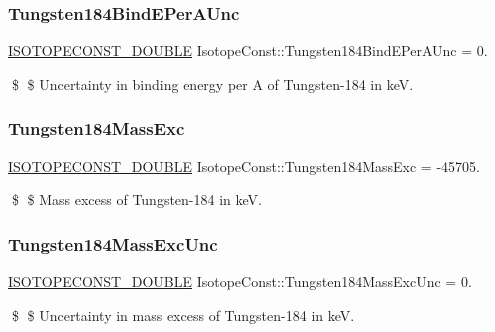 \subsubsection{\texorpdfstring{Tungsten184\+Bind\+E\+Per\+A\+Unc}{Tungsten184BindEPerAUnc}}
{\footnotesize\ttfamily \mbox{\hyperlink{group___isotope_const-_macros_ga8f45a7272ce02c0b4c65c44636ed719a}{I\+S\+O\+T\+O\+P\+E\+C\+O\+N\+S\+T\+\_\+\+D\+O\+U\+B\+LE}} Isotope\+Const\+::\+Tungsten184\+Bind\+E\+Per\+A\+Unc = 0.}

\$ \$ Uncertainty in binding energy per A of Tungsten-\/184 in keV. \mbox{\label{group___isotope_const-_tungsten-_w184_ga936ce3bcb4d1b86f91b8122a8a11d995}} 
\subsubsection{\texorpdfstring{Tungsten184\+Mass\+Exc}{Tungsten184MassExc}}
{\footnotesize\ttfamily \mbox{\hyperlink{group___isotope_const-_macros_ga8f45a7272ce02c0b4c65c44636ed719a}{I\+S\+O\+T\+O\+P\+E\+C\+O\+N\+S\+T\+\_\+\+D\+O\+U\+B\+LE}} Isotope\+Const\+::\+Tungsten184\+Mass\+Exc = -\/45705.}

\$ \$ Mass excess of Tungsten-\/184 in keV. \mbox{\label{group___isotope_const-_tungsten-_w184_ga24de14b6b66435d3f780bef85411e705}} 
\subsubsection{\texorpdfstring{Tungsten184\+Mass\+Exc\+Unc}{Tungsten184MassExcUnc}}
{\footnotesize\ttfamily \mbox{\hyperlink{group___isotope_const-_macros_ga8f45a7272ce02c0b4c65c44636ed719a}{I\+S\+O\+T\+O\+P\+E\+C\+O\+N\+S\+T\+\_\+\+D\+O\+U\+B\+LE}} Isotope\+Const\+::\+Tungsten184\+Mass\+Exc\+Unc = 0.}

\$ \$ Uncertainty in mass excess of Tungsten-\/184 in keV. \mbox{\label{group___isotope_const-_tungsten-_w184_ga38b8aeb278eb3776601828a25727d70c}} 
